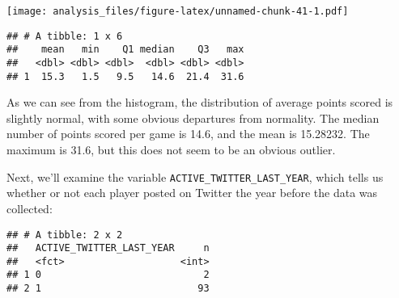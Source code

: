 \documentclass[]{article}
\newenvironment{Shaded}{\begin{snugshade}}{\end{snugshade}}
\newcommand{\DataTypeTok}[1]{\textcolor[rgb]{0.13,0.29,0.53}{#1}}
\newcommand{\FloatTok}[1]{\textcolor[rgb]{0.00,0.00,0.81}{#1}}
\newcommand{\KeywordTok}[1]{\textcolor[rgb]{0.13,0.29,0.53}{\textbf{#1}}}
\newcommand{\NormalTok}[1]{#1}
\newcommand{\OperatorTok}[1]{\textcolor[rgb]{0.81,0.36,0.00}{\textbf{#1}}}
\newcommand{\StringTok}[1]{\textcolor[rgb]{0.31,0.60,0.02}{#1}}
\begin{document}
\texttt{[image: analysis\_files/figure-latex/unnamed-chunk-41-1.pdf]}

\begin{Shaded}
\end{Shaded}

\begin{verbatim}
## # A tibble: 1 x 6
##    mean   min    Q1 median    Q3   max
##   <dbl> <dbl> <dbl>  <dbl> <dbl> <dbl>
## 1  15.3   1.5   9.5   14.6  21.4  31.6
\end{verbatim}

As we can see from the histogram, the distribution of average points
scored is slightly normal, with some obvious departures from normality.
The median number of points scored per game is 14.6, and the mean is
15.28232. The maximum is 31.6, but this does not seem to be an obvious
outlier.

Next, we'll examine the variable \texttt{ACTIVE\_TWITTER\_LAST\_YEAR},
which tells us whether or not each player posted on Twitter the year
before the data was collected:

\begin{Shaded}
\end{Shaded}

\begin{verbatim}
## # A tibble: 2 x 2
##   ACTIVE_TWITTER_LAST_YEAR     n
##   <fct>                    <int>
## 1 0                            2
## 2 1                           93
\end{verbatim}
\end{document}
